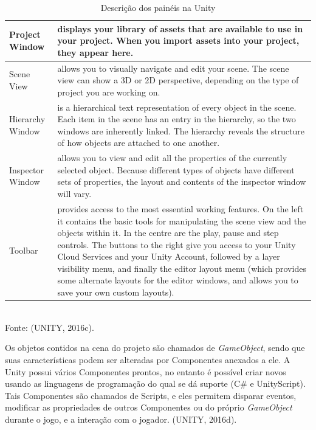 \documentclass[12pt,a4paper]{article}
\newcommand{\source}[1]{\small Fonte: {#1}}
\begin{document}
			\begin{table}[ht]
				\label{tabelaUnity}
				\caption{Descrição dos painéis na Unity}
				\centering
				\small
				\begin{tabular}{p{3.5cm} p{11cm}}
					\hline 
					Project Window & displays your library of assets that are available to use in your project. When you import assets into your project, they appear here. \\ 
					\hline 
					Scene View & allows you to visually navigate and edit your scene. The scene view can show a 3D or 2D perspective, depending on the type of project you are working on. \\ 
					\hline 
					Hierarchy Window & is a hierarchical text representation of every object in the scene. Each item in the scene has an entry in the hierarchy, so the two windows are inherently linked. The hierarchy reveals the structure of how objects are attached to one another. \\ 
					\hline 
					Inspector Window & allows you to view and edit all the properties of the currently selected object. Because different types of objects have different sets of properties, the layout and contents of the inspector window will vary. \\ 
					\hline 
					Toolbar & provides access to the most essential working features. On the left it contains the basic tools for manipulating the scene view and the objects within it. In the centre are the play, pause and step controls. The buttons to the right give you access to your Unity Cloud Services and your Unity Account, followed by a layer visibility menu, and finally the editor layout menu (which provides some alternate layouts for the editor windows, and allows you to save your own custom layouts). \\ 
					\hline 
				\end{tabular}\\
				\vspace{3mm}
				\source{(UNITY, 2016c).}
			\end{table}
			
			Os objetos contidos na cena do projeto são chamados de \textit{GameObject},
			sendo que suas características podem ser alteradas por Componentes anexados a ele.
			A Unity possui vários Componentes prontos,
			no entanto é possível criar novos usando as linguagens de programação do qual se dá suporte (C\# e UnityScript).
			Tais Componentes são chamados de Scripts,
			e eles permitem disparar eventos,
			modificar as propriedades de outros Componentes ou do próprio \textit{GameObject} durante o jogo,
			e a interação com o jogador.
			(UNITY, 2016d).
\end{document}
